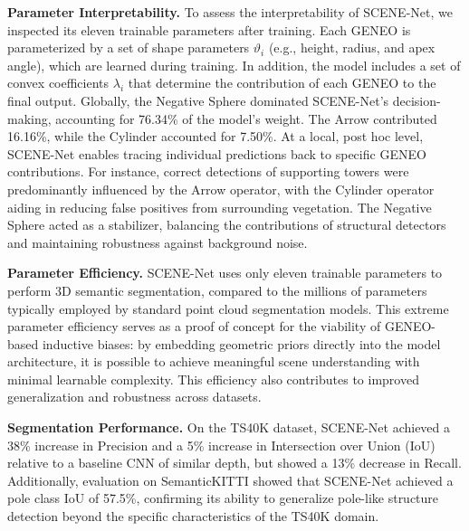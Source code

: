 \textbf{Parameter Interpretability.} \;
To assess the interpretability of SCENE-Net, we inspected its eleven trainable
parameters after training.
%
Each GENEO is parameterized by a set of shape parameters $\vartheta_i$ (e.g.,
height, radius, and apex angle), which are learned during training.
%
In addition, the model includes a set of convex coefficients $\lambda_i$ that
determine the contribution of each GENEO to the final output.
%
Globally, the Negative Sphere dominated SCENE-Net's decision-making, accounting
for 76.34\% of the model’s weight. The Arrow contributed 16.16\%, while the
Cylinder accounted for 7.50\%.
%
At a local, post hoc level, SCENE-Net enables tracing individual predictions
back to specific GENEO contributions. For instance, correct detections of
supporting towers were predominantly influenced by the Arrow operator, with the
Cylinder operator aiding in reducing false positives from surrounding
vegetation. The Negative Sphere acted as a stabilizer, balancing the
contributions of structural detectors and maintaining robustness against
background noise.

\textbf{Parameter Efficiency.} \;
SCENE-Net uses only eleven trainable parameters to perform 3D semantic
segmentation, compared to the millions of parameters typically employed by
standard point cloud segmentation models. This extreme parameter efficiency
serves as a proof of concept for the viability of GENEO-based inductive biases:
by embedding geometric priors directly into the model architecture, it is
possible to achieve meaningful scene understanding with minimal learnable
complexity. This efficiency also contributes to improved generalization and
robustness across datasets.

\textbf{Segmentation Performance.} \;
On the TS40K dataset, SCENE-Net achieved a 38\% increase in Precision and a 5\%
increase in Intersection over Union (IoU) relative to a baseline CNN of similar
depth, but showed a 13\% decrease in Recall.
%
Additionally, evaluation on SemanticKITTI showed that SCENE-Net achieved a pole
class IoU of 57.5\%, confirming its ability to generalize pole-like structure
detection beyond the specific characteristics of the TS40K domain.



